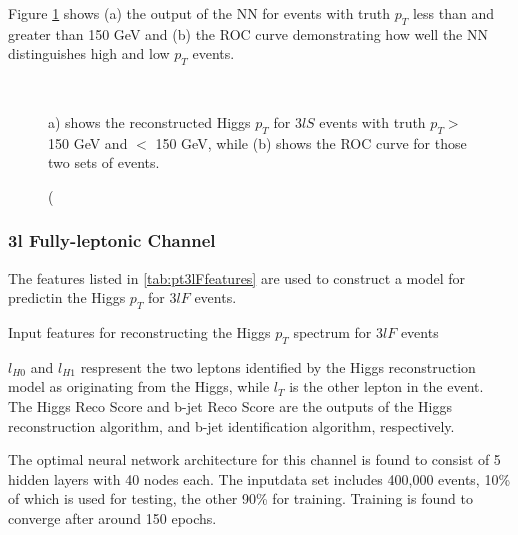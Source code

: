 Figure \ref{fig:pt3lSroc} shows (a) the output of the NN for events with truth $p_T$ less than and greater than 150 GeV and (b) the ROC curve demonstrating how well the NN distinguishes high and low $p_T$ events. 

\begin{figure}[H]                                                                    
    \centering                                                                                     
    \\
    \caption(a) shows the reconstructed Higgs $p_T$ for $3lS$ events with truth $p_T > $ 150 GeV and $<$ 150 GeV, while (b) shows the ROC curve for those two sets of events.
    \label{fig:pt3lSroc}
\end{figure}


\subsubsection{3l Fully-leptonic Channel}
\label{subsec:pt3lF}

The features listed in \ref{tab:pt3lFfeatures} are used to construct a model for predictin the Higgs $p_T$ for $3lF$ events.

\begin{table}[H]

  \caption{Input features for reconstructing the Higgs $p_T$ spectrum for $3lF$ events}
  \label{tab:pt3lFfeatures}
\end{table}

$l_{H0}$ and $l_{H1}$ respresent the two leptons identified by the Higgs reconstruction model as originating from the Higgs, while $l_T$ is the other lepton in the event. The Higgs Reco Score and b-jet Reco Score are the outputs of the Higgs reconstruction algorithm, and b-jet identification algorithm, respectively.

The optimal neural network architecture for this channel is found to consist of 5 hidden layers with 40 nodes each. The inputdata set includes 400,000 events, 10\% of which is used for testing, the other 90\% for training. Training is found to converge after around 150 epochs.

